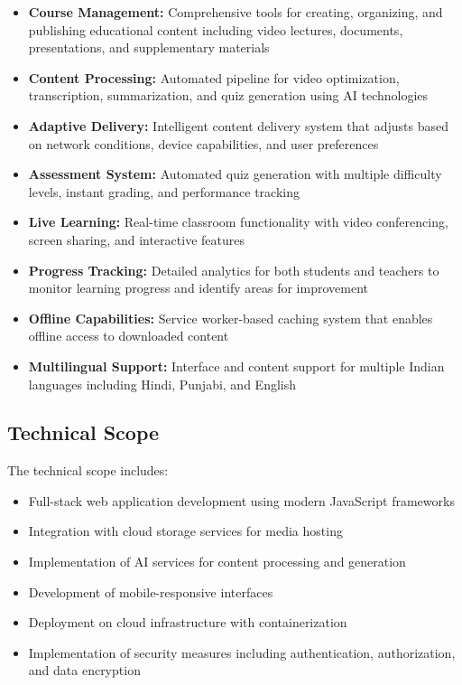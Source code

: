 \documentclass[12pt,a4paper]{report}
\begin{document}
\begin{itemize}
    \item \textbf{Course Management:} Comprehensive tools for creating, organizing, and publishing educational content including video lectures, documents, presentations, and supplementary materials
    \item \textbf{Content Processing:} Automated pipeline for video optimization, transcription, summarization, and quiz generation using AI technologies
    \item \textbf{Adaptive Delivery:} Intelligent content delivery system that adjusts based on network conditions, device capabilities, and user preferences
    \item \textbf{Assessment System:} Automated quiz generation with multiple difficulty levels, instant grading, and performance tracking
    \item \textbf{Live Learning:} Real-time classroom functionality with video conferencing, screen sharing, and interactive features
    \item \textbf{Progress Tracking:} Detailed analytics for both students and teachers to monitor learning progress and identify areas for improvement
    \item \textbf{Offline Capabilities:} Service worker-based caching system that enables offline access to downloaded content
    \item \textbf{Multilingual Support:} Interface and content support for multiple Indian languages including Hindi, Punjabi, and English
\end{itemize}

\subsection{Technical Scope}

The technical scope includes:

\begin{itemize}
    \item Full-stack web application development using modern JavaScript frameworks
    \item Integration with cloud storage services for media hosting
    \item Implementation of AI services for content processing and generation
    \item Development of mobile-responsive interfaces
    \item Deployment on cloud infrastructure with containerization
    \item Implementation of security measures including authentication, authorization, and data encryption
\end{itemize}
\end{document}
